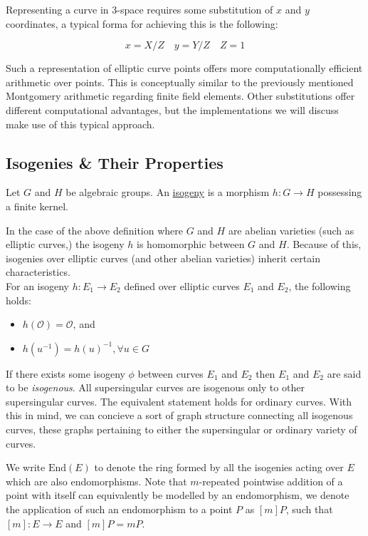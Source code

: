 Representing a curve in 3-space requires some substitution of $x$ and $y$ coordinates, a typical forma for achieving this is the following:

$$
x = X/Z\quad
y = Y/Z\quad
Z = 1
$$

Such a representation of elliptic curve points offers more computationally efficient arithmetic over points. This is conceptually similar to the previously mentioned Montgomery arithmetic regarding finite field elements. Other substitutions offer different computational advantages, but the implementations we will discuss make use of this typical approach.

\subsection{Isogenies \& Their Properties}

\begin{tcolorbox}
\begin{definition}[Isogeny]
\label{defn:isogeny}
Let $G$ and $H$ be algebraic groups. An \underline{isogeny} is a morphism $h: G \rightarrow H$ possessing a finite kernel.
\end{definition}
\end{tcolorbox}

In the case of the above definition where $G$ and $H$ are abelian varieties (such as elliptic curves,) the isogeny $h$ is homomorphic between $G$ and $H$. Because of this, isogenies over elliptic curves (and other abelian varieties) inherit certain characteristics.\\
For an isogeny $h: E_{1} \rightarrow E_{2}$ defined over elliptic curves $E_1$ and $E_2$, the following holds:
\begin{itemize}
\item $h(\mathcal{O}) = \mathcal{O}$, and
\item $h(u^{-1}) = h(u)^{-1}, \forall u \in G$
\end{itemize}

If there exists some isogeny $\phi$ between curves $E_1$ and $E_2$ then $E_1$ and $E_2$ are said to be \emph{isogenous}. All supersingular curves are isogenous only to other supersingular curves. The equivalent statement holds for ordinary curves. With this in mind, we can concieve a sort of graph structure connecting all isogenous curves, these graphs pertaining to either the supersingular or ordinary variety of curves. 

We write $\text{End}(E)$ to denote the ring formed by all the isogenies acting over $E$ which are also endomorphisms. Note that $m$-repeated pointwise addition of a point with itself can equivalently be modelled by an endomorphism, we denote the application of such an endomorphism to a point $P$ as $[m]P$, such that $[m]: E \rightarrow E$ and $[m]P = mP$.

